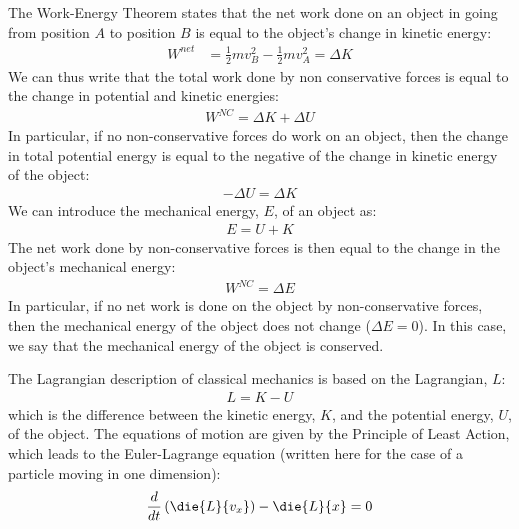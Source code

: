 \begin{chapterSummary}
The Work-Energy Theorem states that the net work done on an object in going from position $A$ to position $B$ is equal to the object's change in kinetic energy:
\begin{align*}
W^{net}&=\frac{1}{2}mv_B^2-\frac{1}{2}mv_A^2=\Delta K
\end{align*}
We can thus write that the total work done by non conservative forces is equal to the change in potential and kinetic energies:
\begin{align*}
W^{NC}=\Delta K+\Delta U
\end{align*}
In particular, if no non-conservative forces do work on an object, then the change in total potential energy is equal to the negative of the change in kinetic energy of the object:
\begin{align*}
-\Delta U=\Delta K
\end{align*}
We can introduce the mechanical energy, $E$, of an object as:
\begin{align*}
E = U+K
\end{align*}
The net work done by non-conservative forces is then equal to the change in the object's mechanical energy:
\begin{align*}
W^{NC}=\Delta E
\end{align*}
In particular, if no net work is done on the object by non-conservative forces, then the mechanical energy of the object does not change ($\Delta E=0$). In this case, we say that the mechanical energy of the object is conserved.

The Lagrangian description of classical mechanics is based on the Lagrangian, $L$:
\begin{align*}
L = K - U
\end{align*}
which is the difference between the kinetic energy, $K$, and the potential energy, $U$, of the object. The equations of motion are given by the Principle of Least Action, which leads to the Euler-Lagrange equation (written here for the case of a particle moving in one dimension):
\begin{align*}
\frac{d}{dt}\left(\die{L}{v_x}\right)-\die{L}{x} = 0
\end{align*}
\end{chapterSummary}

